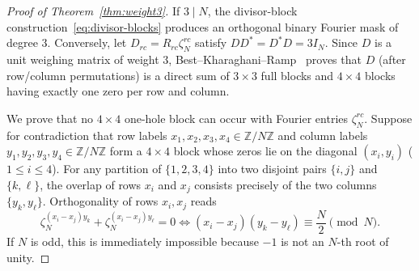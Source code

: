 \documentclass[11pt,reqno]{amsart}
\numberwithin{equation}{section}
\theoremstyle{definition}
\theoremstyle{remark}
\newcommand{\Z}{\mathbb{Z}}
\begin{document}
\begin{proof}[Proof of Theorem~\ref{thm:weight3}]
If $3\mid N$, the divisor-block construction~\eqref{eq:divisor-blocks} produces an orthogonal binary Fourier mask of degree $3$. Conversely, let $D_{rc}=R_{rc}\zeta_N^{rc}$ satisfy $DD^*=D^*D=3I_N$. Since $D$ is a unit weighing matrix of weight $3$, Best--Kharaghani--Ramp~\cite[Theorem~12]{BKR13} proves that $D$ (after row/column permutations) is a direct sum of $3\times 3$ full blocks and $4\times 4$ blocks having exactly one zero per row and column.

We prove that no $4\times 4$ one-hole block can occur with Fourier entries $\zeta_N^{rc}$. Suppose for contradiction that row labels $x_1,x_2,x_3,x_4\in\Z/N\Z$ and column labels $y_1,y_2,y_3,y_4\in\Z/N\Z$ form a $4\times 4$ block whose zeros lie on the diagonal $(x_i,y_i)$ ($1\le i\le 4$). For any partition of $\{1,2,3,4\}$ into two disjoint pairs $\{i,j\}$ and $\{k,\ell\}$, the overlap of rows $x_i$ and $x_j$ consists precisely of the two columns $\{y_k,y_\ell\}$. Orthogonality of rows $x_i,x_j$ reads
\[
\zeta_N^{(x_i-x_j)y_k} + \zeta_N^{(x_i-x_j)y_\ell} = 0
\iff
(x_i-x_j)(y_k-y_\ell) \equiv \frac{N}{2}\pmod N.
\]
If $N$ is odd, this is immediately impossible because $-1$ is not an $N$-th root of unity.


\end{proof}
\end{document}
